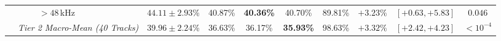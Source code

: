 \documentclass[10pt,twocolumn]{article}
\begin{document}
\begin{table}[!ht]
{\begin{tabular}{@{}lllcccccccc@{}}
			                     &                                                            & $> 48$\,kHz            & $44.11 \pm 2.93$\%   & 40.87\%          & \textbf{40.36\%}    & 40.70\%                & 89.81\%                       & $+3.23\%$                                                  & $[+0.63, +5.83]$  & $0.046$                     \\ \cmidrule(lr){2-11}
			                     & \multicolumn{2}{l}{\textit{Tier 2 Macro-Mean (40 Tracks)}} & $39.96 \pm 2.24$\%     & 36.63\%              & 36.17\%          & \textbf{35.93\%}    & 98.63\%                & $+3.32\%$                     & $[+2.42, +4.23]$                                           & $< 10^{-4}$                                     \\ \bottomrule
		\end{tabular}%
	}
\end{table}
\end{document}
